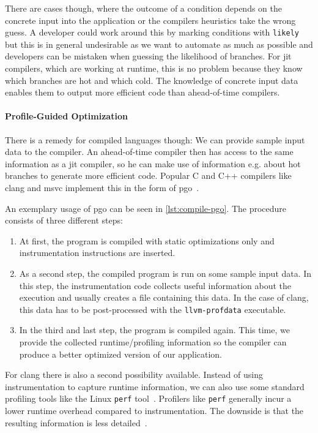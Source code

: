 There are cases though, where the outcome of a condition depends on the concrete input into the application or the compilers heuristics take the wrong guess. A developer could work around this by marking conditions with \texttt{likely} but this is in general undesirable as we want to automate as much as possible and developers can be mistaken when guessing the likelihood of branches. For \gls{jit} compilers, which are working at runtime, this is no problem because they know which branches are hot and which cold. The knowledge of concrete input data enables them to output more efficient code than ahead-of-time compilers.

\paragraph{Profile-Guided Optimization} There is a remedy for compiled languages though: We can provide sample input data to the compiler. An ahead-of-time compiler then has access to the same information as a \gls{jit} compiler, so he can make use of information e.g. about hot branches to generate more efficient code. Popular C and C++ compilers like clang and msvc implement this in the form of \gls{pgo}~\cite{ClangManual, MicrosoftPgo}.

An exemplary usage of \gls{pgo} can be seen in \cref{lst:compile-pgo}. The procedure consists of three different steps:
\begin{enumerate}
	\item At first, the program is compiled with static optimizations only and instrumentation instructions are inserted.
	\item As a second step, the compiled program is run on some sample input data. In this step, the instrumentation code collects useful information about the execution and usually creates a file containing this data. In the case of clang, this data has to be post-processed with the \texttt{llvm-profdata} executable.
	\item In the third and last step, the program is compiled again. This time, we provide the collected runtime/profiling information so the compiler can produce a better optimized version of our application.
\end{enumerate}



For clang there is also a second possibility available. Instead of using instrumentation to capture runtime information, we can also use some standard profiling tools like the Linux \texttt{perf} tool~\cite{LinuxPerf}. Profilers like \texttt{perf} generally incur a lower runtime overhead compared to instrumentation. The downside is that the resulting information is less detailed~\cite{ClangManual}.

